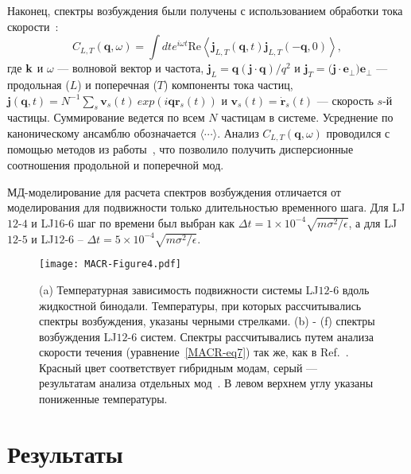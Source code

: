 Наконец, спектры возбуждения были получены с использованием обработки тока скорости~\cite{10.1063/1.5050708}:
\begin{equation}
  C_{L, T}(\mathbf{q}, \omega)=\int dt e^{i \omega t} \text{Re} \left\langle\mathbf{j}_{L, T}(\mathbf{q}, t) \mathbf{j}_{L, T}(-\mathbf{q}, 0)\right\rangle,
  \label{MACR-eq7}
\end{equation}
где ${\bf k}$ и $\omega$ — волновой вектор и частота,
$\mathbf{j}_{L}=\mathbf{q}(\mathbf{j} \cdot \mathbf{q} ) / q^{2}$ и $\mathbf{j}_{T}=(\mathbf{j \cdot e_{\perp})e_{\perp}}$ — продольная ($L$) и поперечная ($T$) компоненты тока частиц,\\
$\mathbf{j}(\mathbf{q}, t)=N^{-1} \sum_{s} \mathbf{v}_{s}(t) \ exp \left(i \mathbf{q} \mathbf{r}_{s}(t)\right)$ и $\mathbf{v}_{s}(t)=\dot{\mathbf{r} }_{s}(t)$ — скорость $s$-й частицы.
Суммирование ведется по всем $N$ частицам в системе.
Усреднение по каноническому ансамблю обозначается $\langle\cdots\rangle$. 
Анализ $C_{L, T}(\mathbf{q}, \omega)$ проводился с помощью методов из работы~\cite{10.1038/s41598-019-46979-y}, что позволило получить дисперсионные соотношения продольной и поперечной мод.

МД-моделирование для расчета спектров возбуждения отличается от моделирования для подвижности только длительностью временного шага. Для LJ$12$-$4$ и LJ$16$-$6$ шаг по времени был выбран как $\Delta t = 1 \times 10 ^ {-4} \sqrt {m \sigma ^ 2 / \epsilon}$, а для LJ$12$-$5$ и LJ$12$-$6$ -- $\Delta t = 5 \times 10 ^ {-4} \sqrt {m \sigma ^ 2 / \epsilon}$.

\begin{figure}[!t]
  \centering
  \texttt{[image: MACR-Figure4.pdf]}
  \caption{(a) Температурная зависимость подвижности системы LJ$12$-$6$ вдоль жидкостной бинодали.
    Температуры, при которых рассчитывались спектры возбуждения, указаны черными стрелками.
    (b) - (f) спектры возбуждения LJ$12$-$6$ систем.
    Спектры рассчитывались путем анализа скорости течения (уравнение~\eqref{MACR-eq7}) так же, как в Ref.~\cite{10.1038/s41598-019-46979-y}.
    Красный цвет соответствует гибридным модам, серый — результатам анализа отдельных мод~\cite{10.1038/s41598-019-46979-y}.
    В левом верхнем углу указаны пониженные температуры.}
  \label{MACR-Figure4}
\end{figure}

\section{Результаты}
\label{MACR-SecResults}

